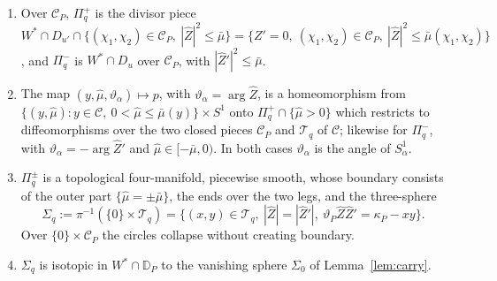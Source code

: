 \begin{lemma}\label{lem:NQ}
\begin{enumerate}
\item Over $\mathscr C_P$, $\Pi_q^+$ is the divisor piece
$W^*\cap D_{u'}\cap\{(\chi_1,\chi_2)\in\mathscr C_P,\ |\hat Z|^2\le\bar\mu\}=\{Z'=0,\ (\chi_1,\chi_2)\in\mathscr C_P,\
|\hat Z|^2\le\bar\mu(\chi_1,\chi_2)\}$, and $\Pi_q^-$ is $W^*\cap D_u$ over $\mathscr C_P$, with $|\hat Z'|^2\le\bar\mu$.
\item The map $(y,\hat\mu,\vartheta_\alpha)\mapsto p$, with $\vartheta_\alpha=\arg\hat Z$, is a homeomorphism from
$\{(y,\hat\mu):y\in\mathscr C,\ 0<\hat\mu\le\bar\mu(y)\}\times S^1$ onto $\Pi_q^+\cap\{\hat\mu>0\}$ which restricts to
diffeomorphisms over the two closed pieces $\mathscr C_P$ and $\mathscr T_q$ of $\mathscr C$; likewise for $\Pi_q^-$, with
$\vartheta_\alpha=-\arg\hat Z'$ and $\hat\mu\in[-\bar\mu,0)$. In both cases $\vartheta_\alpha$ is the angle of $S^1_\alpha$.
\item $\Pi_q^\pm$ is a topological four-manifold, piecewise smooth, whose boundary consists of the outer part
$\{\hat\mu=\pm\bar\mu\}$, the ends over the two legs, and the three-sphere
\[
\Sigma_q:=\pi^{-1}(\{0\}\times\mathscr T_q)=\{(x,y)\in\mathscr T_q,\ |\hat Z|=|\hat Z'|,\ \vartheta_P\hat Z\hat Z'=\kappa_P-xy\}.
\]
Over $\{0\}\times\mathscr C_P$ the circles collapse without creating boundary.
\item $\Sigma_q$ is isotopic in $W^*\cap\mathbb D_P$ to the vanishing sphere $\Sigma_0$ of Lemma~\ref{lem:carry}.
\end{enumerate}
\end{lemma}

